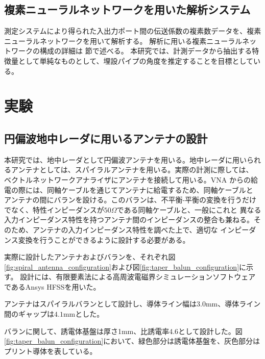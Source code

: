 \documentclass[11pt,a4paper,uplatex]{ujarticle}
\begin{document}
  \newpage

  \subsection{複素ニューラルネットワークを用いた解析システム}

    測定システムにより得られた入出力ポート間の伝送係数の複素数データを、複素ニューラルネットワークを用いて解析する。
    解析に用いる複素ニューラルネットワークの構成の詳細は \label{sec:analysis} 節で述べる。
    本研究では、計測データから抽出する特徴量として単純なものとして、埋設パイプの角度を推定することを目標としている。

\section{実験}

  \subsection{円偏波地中レーダに用いるアンテナの設計}

  本研究では、地中レーダとして円偏波アンテナを用いる。地中レーダに用いられるアンテナとしては、スパイラルアンテナを用いる。実際の計測に際しては、
  ベクトルネットワークアナライザにアンテナを接続して用いる。VNA からの給電の際には、同軸ケーブルを通じてアンテナに給電するため、同軸ケーブルと
  アンテナの間にバランを設ける。このバランは、不平衡-平衡の変換を行うだけでなく、特性インピーダンスが$50\Omega$である同軸ケーブルと、一般にこれと
  異なる入力インピーダンス特性を持つアンテナ間のインピーダンスの整合も兼ねる。そのため、アンテナの入力インピーダンス特性を調べた上で、適切な
  インピーダンス変換を行うことができるように設計する必要がある。

  実際に設計したアンテナおよびバランを、それぞれ図\ref{fig:spiral_antenna_configuration}および図\ref{fig:taper_balun_configuration}に示す。
  設計には、有限要素法による高周波電磁界シミュレーションソフトウェアであるAnsys HFSSを用いた。

  アンテナはスパイラルバランとして設計し、導体ライン幅は$3.0\mathrm{mm}$、導体ライン間のギャップは$4.1\mathrm{mm}$とした。
  
  バランに関して、誘電体基盤は厚さ1mm、比誘電率4.6として設計した。図\ref{fig:taper_balun_configuration}において、緑色部分は誘電体基盤を、灰色部分は
  プリント導体を表している。
\end{document}
